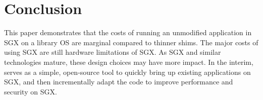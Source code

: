 \section{Conclusion}

This paper demonstrates that the costs of running an unmodified application in SGX on a library OS are
marginal compared to thinner shims.
The major costs of using SGX are still hardware limitations of SGX.
As SGX and similar technologies mature, these design choices may have more impact.
In the interim, \sysname{} serves as a simple, open-source tool to quickly bring up
existing applications on SGX, and then incrementally adapt the code to improve performance and security on SGX.

